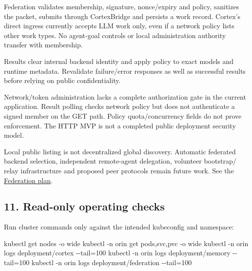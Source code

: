 \documentclass[
  10pt,
]{article}
\newenvironment{Shaded}{}{}
\newcommand{\AttributeTok}[1]{\textcolor[rgb]{0.49,0.56,0.16}{#1}}
\newcommand{\ExtensionTok}[1]{#1}
\newcommand{\NormalTok}[1]{#1}
\newcommand{\OperatorTok}[1]{\textcolor[rgb]{0.40,0.40,0.40}{#1}}
\begin{document}
Federation validates membership, signature, nonce/expiry and policy,
sanitizes the packet, submits through CortexBridge and persists a work
record. Cortex's direct ingress currently accepts LLM work only, even if
a network policy lists other work types. No agent-goal controls or local
administration authority transfer with membership.

Results clear internal backend identity and apply policy to exact models
and runtime metadata. Revalidate failure/error responses as well as
successful results before relying on public confidentiality.

Network/token administration lacks a complete authorization gate in the
current application. Result polling checks network policy but does not
authenticate a signed member on the GET path. Policy quota/concurrency
fields do not prove enforcement. The HTTP MVP is not a completed public
deployment security model.

Local public listing is not decentralized global discovery. Automatic
federated backend selection, independent remote-agent delegation,
volunteer bootstrap/ relay infrastructure and proposed peer protocols
remain future work. See the
\href{https://github.com/ILGSupreme/Orin/blob/main/docs/orin-federation-network-plan.md}{Federation
plan}.

\hypertarget{read-only-operating-checks}{%
\subsection{11. Read-only operating
checks}\label{read-only-operating-checks}}

Run cluster commands only against the intended kubeconfig and namespace:

\begin{Shaded}
\begin{Highlighting}[]
\ExtensionTok{kubectl}\NormalTok{ get nodes }\AttributeTok{{-}o}\NormalTok{ wide}
\ExtensionTok{kubectl} \AttributeTok{{-}n}\NormalTok{ orin get pods,svc,pvc }\AttributeTok{{-}o}\NormalTok{ wide}
\ExtensionTok{kubectl} \AttributeTok{{-}n}\NormalTok{ orin logs deployment/cortex }\AttributeTok{{-}{-}tail}\OperatorTok{=}\NormalTok{100}
\ExtensionTok{kubectl} \AttributeTok{{-}n}\NormalTok{ orin logs deployment/memory }\AttributeTok{{-}{-}tail}\OperatorTok{=}\NormalTok{100}
\ExtensionTok{kubectl} \AttributeTok{{-}n}\NormalTok{ orin logs deployment/federation }\AttributeTok{{-}{-}tail}\OperatorTok{=}\NormalTok{100}
\end{Highlighting}
\end{Shaded}
\end{document}
